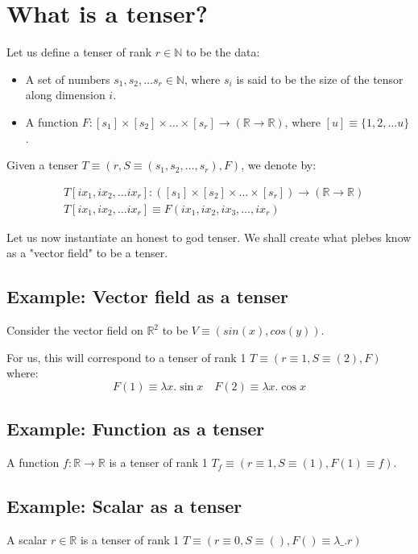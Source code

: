 \documentclass{article}
\begin{document}

\section{What is a tenser?}
Let us define a tenser of rank $r \in \mathbb N$
to be the data:

\begin{itemize}
    \item A set of numbers $s_1, s_2, \dots s_r \in \mathbb N$, where
         $s_i$ is said to be the size of the tensor along dimension $i$.
    \item A function $F: [s_1] \times [s_2] \times \dots \times [s_r] \rightarrow
        (\mathbb R \rightarrow \mathbb R)$, where $[u] \equiv \{ 1, 2, \dots u\}$.
\end{itemize}

Given a tenser $T \equiv (r, S \equiv (s_1, s_2, \dots, s_r), F)$, we
denote by:

\begin{align*}
&T[ix_1, ix_2, \dots ix_r] : ([s_1] \times [s_2] \times \dots \times [s_r]) \rightarrow
    (\mathbb R \rightarrow \mathbb R) \\
&T[ix_1, ix_2, \dots ix_r] \equiv F(ix_1, ix_2, ix_3, \dots, ix_r)
\end{align*}

Let us now instantiate an honest to god tenser. We shall create what
plebes know as a "vector field" to be a tenser.

\subsection{Example: Vector field as a tenser}
Consider the vector field on $\mathbb R^2$ to be $V \equiv (sin(x), cos(y))$.

For us, this will correspond to a tenser of rank 1 $T \equiv (r \equiv 1, S \equiv (2), F)$ where:
$$
F(1) \equiv \lambda x. \sin x \quad F(2) \equiv \lambda x. \cos x
$$

\subsection{Example: Function as a tenser}
A function $f: \mathbb R \rightarrow \mathbb R$ is a tenser of rank 1
$T_f \equiv (r \equiv 1, S \equiv (1), F(1) \equiv f)$.

\subsection{Example: Scalar as a tenser}
A scalar $r \in \mathbb R$ is a tenser of rank 1 $T \equiv (r\equiv 0, S\equiv(), F() \equiv \lambda \_. r)$
\end{document}
